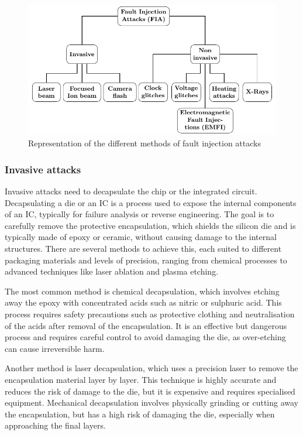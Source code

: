 \begin{figure}[ht]
    \centering
    \includegraphics[page=2, width=.75\textwidth]{c2_soa/img/physicalAttacks.pdf}
    \caption{Representation of the different methods of fault injection attacks}
    \label{fig:fia}
\end{figure}

\subsubsection{Invasive attacks}
\label{subsubsection:invasiveAttacks}
Invasive attacks need to decapsulate the chip or the integrated circuit.
Decapsulating a die or an IC is a process used to expose the internal components of an IC, typically for failure analysis or reverse engineering. The goal is to carefully remove the protective encapsulation, which shields the silicon die and is typically made of epoxy or ceramic, without causing damage to the internal structures. There are several methods to achieve this, each suited to different packaging materials and levels of precision, ranging from chemical processes to advanced techniques like laser ablation and plasma etching.

The most common method is chemical decapsulation, which involves etching away the epoxy with concentrated acids such as nitric or sulphuric acid. This process requires safety precautions such as protective clothing and neutralisation of the acids after removal of the encapsulation. It is an effective but dangerous process and requires careful control to avoid damaging the die, as over-etching can cause irreversible harm.

Another method is laser decapsulation, which uses a precision laser to remove the encapsulation material layer by layer. This technique is highly accurate and reduces the risk of damage to the die, but it is expensive and requires specialised equipment. Mechanical decapsulation involves physically grinding or cutting away the encapsulation, but has a high risk of damaging the die, especially when approaching the final layers.

